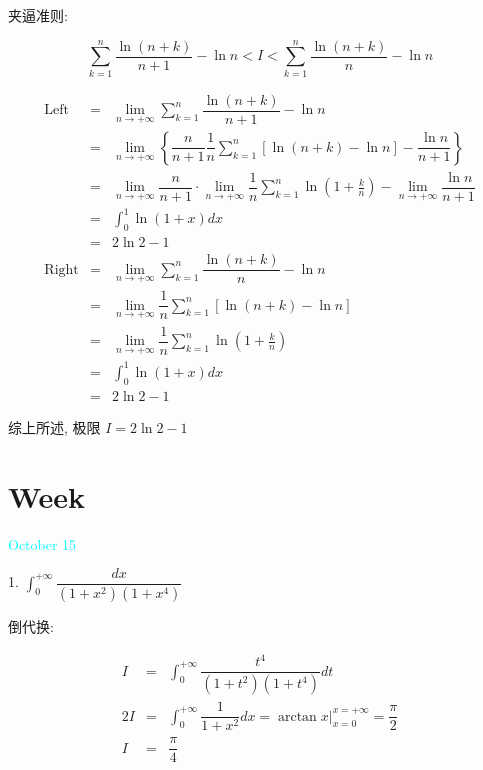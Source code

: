\begin{solution}

	夹逼准则:

	$$\sum\limits_{k=1}^{n}\dfrac{\ln(n+k)}{n+1}-\ln n<I<\sum\limits_{k=1}^{n}\dfrac{\ln(n+k)}{n}-\ln n$$

	\begin{eqnarray*}
		\text{Left}  & = & \lim\limits_{n\to +\infty}\sum\limits_{k=1}^{n}\dfrac{\ln(n+k)}{n+1}-\ln n\\
		             & = & \lim\limits_{n\to +\infty}\left\lbrace \dfrac{n}{n+1}\dfrac{1}{n}\sum\limits_{k=1}^{n}[\ln(n+k)-\ln n]-\dfrac{\ln n}{n+1}\right\rbrace \\
					 & = & \lim\limits_{n\to +\infty}\dfrac{n}{n+1}\cdot\lim\limits_{n\to +\infty}\dfrac{1}{n}\sum\limits_{k=1}^{n}\ln(1+\frac{k}{n})-
					 \lim\limits_{n\to +\infty}\dfrac{\ln n}{n+1}\\
		             & = & \int_{0}^{1}\ln(1+x)dx\\
		             & = & 2\ln2-1\\
		\text{Right} & = & \lim\limits_{n\to +\infty}\sum\limits_{k=1}^{n}\dfrac{\ln(n+k)}{n}-\ln n\\
		             & = & \lim\limits_{n\to +\infty}\dfrac{1}{n}\sum\limits_{k=1}^{n}[\ln(n+k)-\ln n]\\
		             & = & \lim\limits_{n\to +\infty}\dfrac{1}{n}\sum\limits_{k=1}^{n}\ln(1+\frac{k}{n})\\
		             & = & \int_{0}^{1}\ln(1+x)dx\\
		             & = & 2\ln2-1
	\end{eqnarray*}
	
	综上所述, 极限 $I=2\ln2-1$
\end{solution}


\section{Week }
\textcolor{cyan}{October 15}

1. $\displaystyle{\int_{0}^{+\infty}\dfrac{dx}{(1+x^2)(1+x^4)}}$

\begin{solution}

	倒代换:

	\begin{eqnarray*}
		I & = & \int_{0}^{+\infty}\dfrac{t^4}{(1+t^2)(1+t^4)}dt \\
	   2I & = & \int_{0}^{+\infty}\dfrac{1}{1+x^2}dx = \arctan x\big|_{x = 0}^{x = +\infty} = \dfrac{\pi}{2}\\
		I & = & \dfrac{\pi}{4}
	\end{eqnarray*}
\end{solution}


